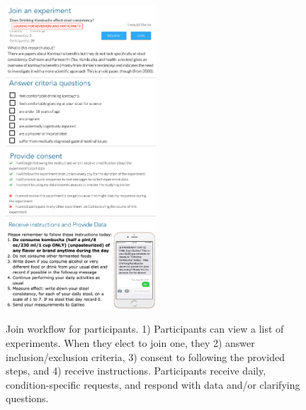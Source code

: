 
\begin{figure}[!h]
  \centering
  \includegraphics[width=0.5\textwidth]{figures/galileo/galileo-2-run}
  \includegraphics[width=0.5\textwidth]{figures/galileo/galileo-2-run-01}
  \caption[Join workflow for participants]
{Join workflow for participants. 1) Participants can view a list of experiments. When they elect to join one, they 2) answer inclusion/exclusion criteria, 3) consent to following the provided steps, and 4) receive instructions. Participants receive daily, condition-specific requests, and respond with data and/or clarifying questions. }
  \label{fig:galileo-2-run}
\end{figure}

